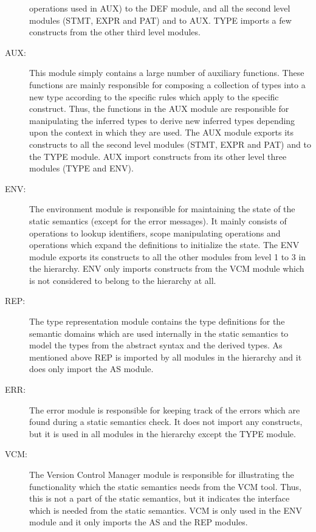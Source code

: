 \documentclass[a4paper,dvips]{article}
\begin{document}
\begin{description}
     operations used in AUX) to the DEF module, and all the second
     level modules (STMT, EXPR and PAT) and to AUX. TYPE 
     imports a few constructs from the other third level modules.
\item[AUX:] This module simply contains a large number of auxiliary
     functions. These functions are mainly
     responsible for composing a collection of types
     into a new type according to the specific rules which apply to
     the specific construct. Thus, the functions in the AUX module are
     responsible for manipulating the inferred types to derive new
     inferred types depending upon the context in which they are used.
     The AUX module exports its constructs to all the second level
     modules (STMT, EXPR and PAT) and to the TYPE module. AUX
     import constructs from its other level three modules (TYPE and
     ENV). 
\item[ENV:] The environment module is responsible for maintaining the
     state of the static semantics (except for the error messages).
     It mainly consists of operations to lookup identifiers, scope
     manipulating operations and operations which expand the
     definitions to initialize the state. The ENV module exports its
     constructs to all the other modules from level 1 to 3 in the
     hierarchy. ENV only imports constructs from the VCM module which
     is not considered to belong to the hierarchy at all.   
\item[REP:] The type representation module contains the type
     definitions for the semantic domains which are used internally in
     the static semantics to model the types from the abstract syntax
     and the derived types. As mentioned above REP is imported by all
     modules in the hierarchy and it does only import the AS module.
\item[ERR:] The error module is responsible for keeping track of the
     errors which are found during a static semantics check. It does
     not import any constructs, but it is used in all modules in the
     hierarchy except the TYPE module. 
\item[VCM:] The Version Control Manager module is responsible for
     illustrating the functionality which the static semantics needs
     from the VCM tool. Thus, this is not a part of the static
     semantics, but it indicates the interface which is needed from
     the static semantics. VCM is only used in the ENV module and it
     only imports the AS and the REP modules.
\end{description}
\end{document}
